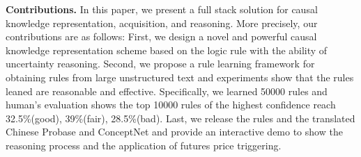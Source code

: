 	
	
	
\textbf{Contributions.}
In this paper, we present a full stack solution for causal knowledge representation, acquisition, and reasoning. More precisely, our contributions are as follows:
First, we design a novel and powerful causal knowledge representation scheme based on the logic rule with the ability of uncertainty reasoning.
Second, we propose a rule learning framework for obtaining rules from large unstructured text and experiments show that the rules leaned are reasonable and effective. 
Specifically, we learned 50000 rules and human's evaluation shows the top 10000 rules of the highest confidence reach 32.5\%(good), 39\%(fair), 28.5\%(bad). Last, we release the rules and the translated Chinese Probase and ConceptNet and provide an interactive demo to show the reasoning process and the application of futures price triggering. 
	
%	
	
